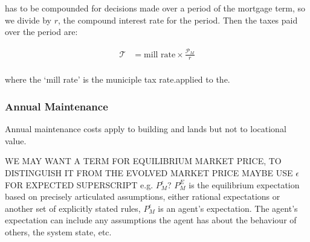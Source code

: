 has to be compounded for decisions made over a period of the mortgage term, so we divide by $r$, the \gls{compound interest rate} for the period. Then the taxes paid over the period are:


\begin{align*}
\mathcal{T} &= \text{mill rate} \times \frac{\mathcal{P}_M}{r} \\
\end{align*}

where the `\gls{mill rate}' is the municiple tax rate.applied to the. 

\subsubsection{Annual Maintenance}
Annual maintenance costs apply to building and lands but not to locational value.

WE MAY  WANT A TERM FOR EQUILIBRIUM MARKET PRICE, TO DISTINGUISH IT FROM THE EVOLVED MARKET PRICE  %
MAYBE USE $\epsilon$ FOR EXPECTED SUPERSCRIPT e.g. $P_M^{\epsilon}$? %
 $P_M^{E}$ is the equilibrium expectation based on precisely articulated assumptions, either rational expectations or another set of explicitly stated rules,  $P_M^{\epsilon}$ is an agent's expectation. The agent's expectation can include any assumptions the agent has about the behaviour of others, the system state, etc. %


